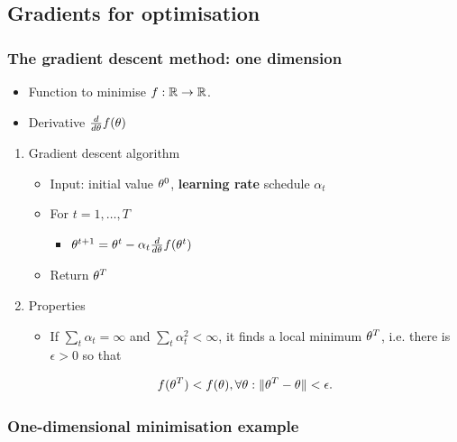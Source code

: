 \documentclass[smaller]{article}
\begin{document}
\subsection{Gradients for optimisation}
\label{sec:org60765cf}
\subsubsection{The gradient descent method: one dimension}
\label{sec:org922a431}
\begin{itemize}
\item Function to minimise \(f : \mathbb{R} \to \mathbb{R}\).
\item Derivative \(\frac{d}{d \theta} f(\theta)\)
\end{itemize}
\begin{enumerate}
\item Gradient descent algorithm
\label{sec:org185c0fb}
\begin{itemize}
\item Input: initial value \(\theta^0\), \textbf{learning rate} schedule \(\alpha_t\)
\item For \(t=1, \ldots, T\)
\begin{itemize}
\item \(\theta^{t+1} = \theta^t - \alpha_t \frac{d}{d \theta} f(\theta^t)\)
\end{itemize}
\item Return \(\theta^T\)
\end{itemize}
\item Properties
\label{sec:orgbf64f39}
\begin{itemize}
\item If \(\sum_t \alpha_t = \infty\) and \(\sum_t \alpha_t^2 < \infty\), it finds a local minimum \(\theta^T\), i.e. there is \(\epsilon > 0\) so that
\end{itemize}
\[
f(\theta^T) < f(\theta), \forall \theta: \|\theta^T - \theta\| < \epsilon.
\]
\end{enumerate}
\subsubsection{One-dimensional minimisation example}
\label{sec:orgfa5ace5}
\end{document}
